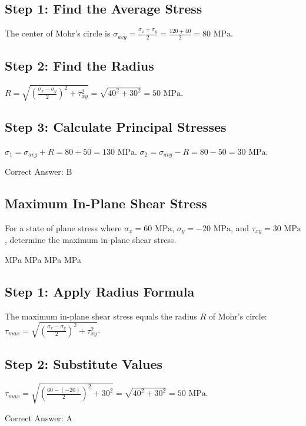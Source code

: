 \begin{solution}

\subsection*{Step 1: Find the Average Stress}
The center of Mohr's circle is $\sigma_{avg} = \frac{\sigma_x + \sigma_y}{2} = \frac{120 + 40}{2} = 80 \text{ MPa}$.

\subsection*{Step 2: Find the Radius}
$R = \sqrt{(\frac{\sigma_x - \sigma_y}{2})^2 + \tau_{xy}^2} = \sqrt{40^2 + 30^2} = 50 \text{ MPa}$.

\subsection*{Step 3: Calculate Principal Stresses}
$\sigma_1 = \sigma_{avg} + R = 80 + 50 = 130 \text{ MPa}$. $\sigma_2 = \sigma_{avg} - R = 80 - 50 = 30 \text{ MPa}$.

Correct Answer: B
\end{solution}

\clearpage

\subsection{Maximum In-Plane Shear Stress}

For a state of plane stress where $\sigma_{x} = 60\text{ MPa}$, $\sigma_{y} = -20\text{ MPa}$, and $\tau_{xy} = 30\text{ MPa}$, determine the maximum in-plane shear stress.

\begin{choices}
     MPa
     MPa
     MPa
     MPa
\end{choices}

\begin{solution}

\subsection*{Step 1: Apply Radius Formula}
The maximum in-plane shear stress equals the radius $R$ of Mohr's circle: $\tau_{max} = \sqrt{(\frac{\sigma_x - \sigma_y}{2})^2 + \tau_{xy}^2}$.

\subsection*{Step 2: Substitute Values}
$\tau_{max} = \sqrt{(\frac{60 - (-20)}{2})^2 + 30^2} = \sqrt{40^2 + 30^2} = 50 \text{ MPa}$.

Correct Answer: A
\end{solution}

